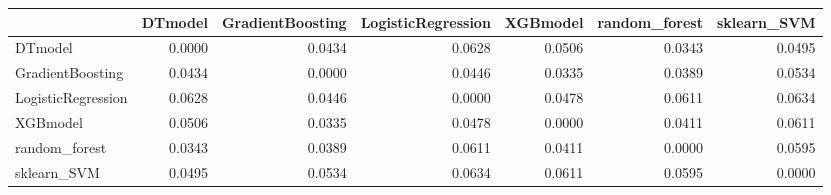 \begin{tabular}{lrrrrrr}
\toprule
 & DTmodel & GradientBoosting & LogisticRegression & XGBmodel & random_forest & sklearn_SVM \\
\midrule
DTmodel & 0.0000 & 0.0434 & 0.0628 & 0.0506 & 0.0343 & 0.0495 \\
GradientBoosting & 0.0434 & 0.0000 & 0.0446 & 0.0335 & 0.0389 & 0.0534 \\
LogisticRegression & 0.0628 & 0.0446 & 0.0000 & 0.0478 & 0.0611 & 0.0634 \\
XGBmodel & 0.0506 & 0.0335 & 0.0478 & 0.0000 & 0.0411 & 0.0611 \\
random_forest & 0.0343 & 0.0389 & 0.0611 & 0.0411 & 0.0000 & 0.0595 \\
sklearn_SVM & 0.0495 & 0.0534 & 0.0634 & 0.0611 & 0.0595 & 0.0000 \\
\bottomrule
\end{tabular}
